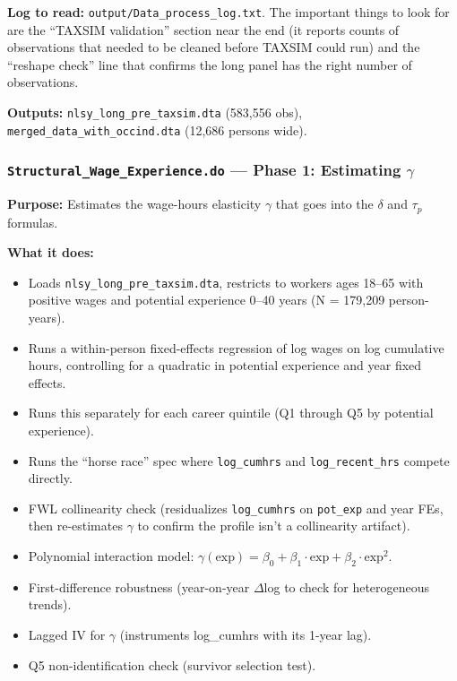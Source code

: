 \documentclass[11pt, letterpaper]{article}
\newcommand{\codebox}[1]{\texttt{\small #1}}
\newcommand{\dofile}[1]{\texttt{#1}}
\newcommand{\logfile}[1]{\texttt{#1}}
\newcommand{\datafile}[1]{\texttt{#1}}
\begin{document}
\textbf{Log to read:} \logfile{output/Data\_process\_log.txt}. The important things to look for are the ``TAXSIM validation'' section near the end (it reports counts of observations that needed to be cleaned before TAXSIM could run) and the ``reshape check'' line that confirms the long panel has the right number of observations.

\textbf{Outputs:} \datafile{nlsy\_long\_pre\_taxsim.dta} (583,556 obs), \datafile{merged\_data\_with\_occind.dta} (12,686 persons wide).

\vspace{6pt}
\subsubsection{\dofile{Structural\_Wage\_Experience.do} \textnormal{--- Phase 1: Estimating $\gamma$}}

\textbf{Purpose:} Estimates the wage-hours elasticity $\gamma$ that goes into the $\delta$ and $\tau_p$ formulas.

\textbf{What it does:}
\begin{itemize}
    \item Loads \datafile{nlsy\_long\_pre\_taxsim.dta}, restricts to workers ages 18--65 with positive wages and potential experience 0--40 years (N = 179,209 person-years).
    \item Runs a within-person fixed-effects regression of log wages on log cumulative hours, controlling for a quadratic in potential experience and year fixed effects.
    \item Runs this separately for each career quintile (Q1 through Q5 by potential experience).
    \item Runs the ``horse race'' spec where \codebox{log\_cumhrs} and \codebox{log\_recent\_hrs} compete directly.
    \item FWL collinearity check (residualizes \codebox{log\_cumhrs} on \codebox{pot\_exp} and year FEs, then re-estimates $\gamma$ to confirm the profile isn't a collinearity artifact).
    \item Polynomial interaction model: $\gamma(\text{exp}) = \beta_0 + \beta_1 \cdot \text{exp} + \beta_2 \cdot \text{exp}^2$.
    \item First-difference robustness (year-on-year $\Delta$log to check for heterogeneous trends).
    \item Lagged IV for $\gamma$ (instruments log\_cumhrs with its 1-year lag).
    \item Q5 non-identification check (survivor selection test).
\end{itemize}
\end{document}
